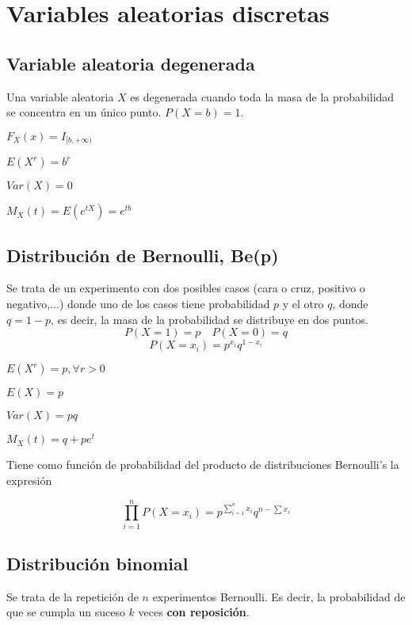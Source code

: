 \chapter{Variables aleatorias discretas}
\section{Variable aleatoria degenerada}

Una variable aleatoria $X$ es degenerada cuando toda la masa
de la probabilidad se concentra en un único punto. $P(X=b)=1$.

\begin{itemize*}
\item $F_X(x) = I_{[b,+\infty)}$
\item $E(X^r)=b^r$
\item $Var(X) = 0$
\item $M_X(t) = E(e^{tX})=e^{tb}$
\end{itemize*}

\section{Distribución de Bernoulli, Be(p)}

Se trata de un experimento con dos posibles casos (cara o cruz, positivo o negativo,...)
donde uno de los casos tiene probabilidad $p$ y el otro $q$, donde $q=1-p$, es decir,
la masa de la probabilidad se distribuye en dos puntos.
$$ P(X=1)= p \quad P(X=0)=q$$
$$ P(X=x_i)= p^{x_i}q^{1-x_i}$$

\begin{itemize*}
\item $E(X^r)=p, \forall r >0$
\item $E(X)=p$
\item $Var(X)=pq$
\item $M_X(t)=q+pe^t$
\end{itemize*}

Tiene como función de probabilidad del producto de distribuciones
Bernoulli's la expresión

$$\prod_{i=1}^{n}P(X=x_i) =p^{\sum_{i=1}^n x_i}q^{n-\sum x_i} $$

\section{Distribución binomial}

Se trata de la repetición de $n$ experimentos Bernoulli. Es decir, la probabilidad
de que se cumpla un suceso $k$ veces \textbf{con reposición}.

